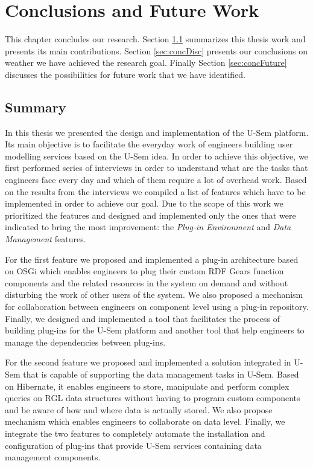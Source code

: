 
\chapter{\label{cha:conclusions}Conclusions and Future Work}

This chapter concludes our research. Section \ref{sec:concSumm} summarizes this thesis work and presents its main contributions. Section \ref{sec:concDisc} presents our conclusions on weather we have achieved the research goal. Finally Section \ref{sec:concFuture} discusses the possibilities for future work that we have identified.


\section{Summary}
\label{sec:concSumm}

In this thesis we presented the design and implementation of the U-Sem platform. Its main objective is to facilitate the everyday work of engineers building user modelling services based on the U-Sem idea. In order to achieve this objective, we first performed series of interviews in order to understand what are the tasks that engineers face every day and which of them require a lot of overhead work. Based on the results from the interviews we compiled a list of features which have to be implemented in order to achieve our goal. Due to the scope of this work we prioritized the features and designed and implemented only the ones that were indicated to bring the most improvement: the \textit{Plug-in Environment} and \textit{Data Management} features.

For the first feature we proposed and implemented a plug-in architecture based on OSGi which enables engineers to plug their custom RDF Gears function components and the related resources in the system on demand and without disturbing the work of other users of the system. We also proposed a mechanism for collaboration between engineers on component level using a plug-in repository. Finally, we designed and implemented a tool that facilitates the process of building plug-ins for the U-Sem platform and another tool that help engineers to manage the dependencies between plug-ins.

For the second feature we proposed and implemented a solution integrated in U-Sem that is capable of supporting the data management tasks in U-Sem. Based on Hibernate, it enables engineers to store, manipulate and perform complex queries on RGL data structures without having to program custom components and be aware of how and where data is actually stored. We also propose mechanism which enables engineers to collaborate on data level. Finally, we integrate the two features to completely automate the installation and configuration of plug-ins that provide U-Sem services containing data management components.

